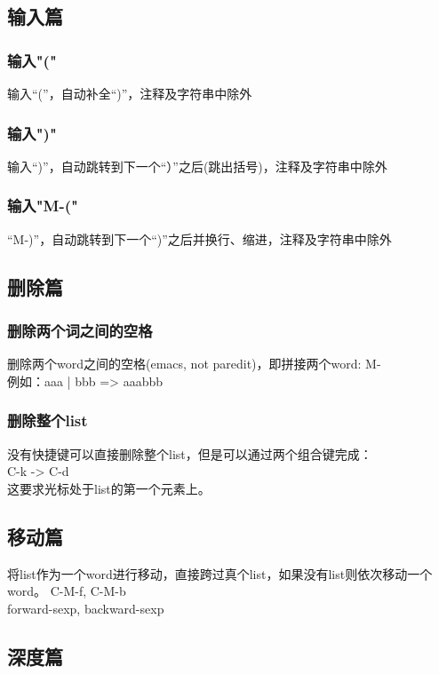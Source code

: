 \documentclass[a4paper,11pt]{article}
\begin{document}
  \subsection[输入篇]{输入篇}
  \subsubsection[输入"("]{输入"("}
  输入“(”，自动补全“)”，注释及字符串中除外
  \subsubsection[输入")"]{输入")"}
  输入“)”，自动跳转到下一个“）”之后(跳出括号)，注释及字符串中除外
  \subsubsection[输入"M-("]{输入"M-("}
  “M-)”，自动跳转到下一个“)”之后并换行、缩进，注释及字符串中除外

  \subsection[删除篇]{删除篇}
  \subsubsection[删除两个词之间的空格]{删除两个词之间的空格}
  删除两个word之间的空格(emacs, not paredit)，即拼接两个word: M-\bs \\
  例如：aaa  |   bbb => aaabbb
  \subsubsection[删除整个list]{删除整个list}
  没有快捷键可以直接删除整个list，但是可以通过两个组合键完成：\\
  C-k -> C-d\\
  这要求光标处于list的第一个元素上。

  \subsection[移动篇]{移动篇}
  将list作为一个word进行移动，直接跨过真个list，如果没有list则依次移动一个word。
  C-M-f, C-M-b\\
  forward-sexp, backward-sexp\\
  
  \subsection[深度篇]{深度篇}
\end{document}
